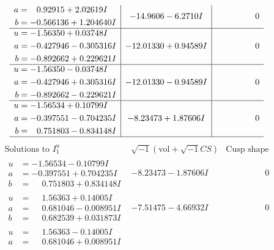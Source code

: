 \documentclass[1p]{elsarticle_modified}
\theoremstyle{definition}
\newcommand{\I}{\sqrt{-1}}
\begin{document}
$$\begin{array}{c|c|c}
\begin{aligned}
a &= \phantom{-}0.92915 + 2.02619 I \\
b &= -0.566136 + 1.204640 I\end{aligned}
 & -14.9606 - 6.2710 I & \phantom{-0.000000 } 0 \\ \hline\begin{aligned}
u &= -1.56350 + 0.03748 I \\
a &= -0.427946 - 0.305316 I \\
b &= -0.892662 + 0.229621 I\end{aligned}
 & -12.01330 + 0.94589 I & \phantom{-0.000000 } 0 \\ \hline\begin{aligned}
u &= -1.56350 - 0.03748 I \\
a &= -0.427946 + 0.305316 I \\
b &= -0.892662 - 0.229621 I\end{aligned}
 & -12.01330 - 0.94589 I & \phantom{-0.000000 } 0 \\ \hline\begin{aligned}
u &= -1.56534 + 0.10799 I \\
a &= -0.397551 - 0.704235 I \\
b &= \phantom{-}0.751803 - 0.834148 I\end{aligned}
 & -8.23473 + 1.87606 I & \phantom{-0.000000 } 0\\
 \hline 
 \end{array}$$\newpage$$\begin{array}{c|c|c}  
\text{Solutions to }I^u_{1}& \I (\text{vol} + \sqrt{-1}CS) & \text{Cusp shape}\\
 \hline 
\begin{aligned}
u &= -1.56534 - 0.10799 I \\
a &= -0.397551 + 0.704235 I \\
b &= \phantom{-}0.751803 + 0.834148 I\end{aligned}
 & -8.23473 - 1.87606 I & \phantom{-0.000000 } 0 \\ \hline\begin{aligned}
u &= \phantom{-}1.56363 + 0.14005 I \\
a &= \phantom{-}0.681046 - 0.008951 I \\
b &= \phantom{-}0.682539 + 0.031873 I\end{aligned}
 & -7.51475 - 4.66932 I & \phantom{-0.000000 } 0 \\ \hline\begin{aligned}
u &= \phantom{-}1.56363 - 0.14005 I \\
a &= \phantom{-}0.681046 + 0.008951 I \\

\end{aligned}
\end{array}$$
\end{document}
